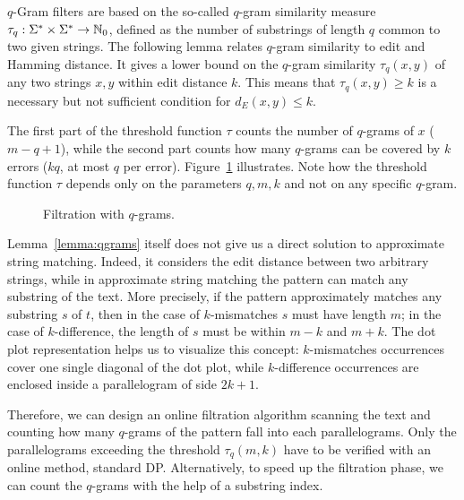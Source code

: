 $q$-Gram filters are based on the so-called $q$-gram similarity measure $\tau_q : \Sigma^{*} \times \Sigma^{*} \rightarrow \mathbb {N}_0$, defined as the number of substrings of length $q$ common to two given strings.
The following lemma relates $q$-gram similarity to edit and Hamming distance.
It gives a lower bound on the $q$-gram similarity $\tau_q(x,y)$ of any two strings $x,y$ within edit distance $k$.
This means that $\tau_q(x,y) \geq k$ is a necessary but not sufficient condition for $d_E(x,y) \leq k$.
The first part of the threshold function $\tau$ counts the number of $q$-grams of $x$ (\ie $m - q + 1$), while the second part counts how many $q$-grams can be covered by $k$ errors ($kq$, \ie at most $q$ per error).
Figure~\ref{fig:qgrams-ext} illustrates.
Note how the threshold function $\tau$ depends only on the parameters $q,m,k$ and not on any specific $q$-gram.

\begin{figure}[h]
\begin{center}
\caption{Filtration with $q$-grams.}
\label{fig:qgrams-ext}

\end{center}
\end{figure}

Lemma~\ref{lemma:qgrams} itself does not give us a direct solution to approximate string matching.
Indeed, it considers the edit distance between two arbitrary strings, while in approximate string matching the pattern can match any substring of the text.
More precisely, if the pattern approximately matches any substring $s$ of $t$, then in the case of $k$-mismatches $s$ must have length $m$; in the case of $k$-difference, the length of $s$ must be within $m - k$ and $m + k$.
The dot plot representation helps us to visualize this concept: $k$-mismatches occurrences cover one single diagonal of the dot plot, while $k$-difference occurrences are enclosed inside a parallelogram of side $2k+1$.

Therefore, we can design an online filtration algorithm scanning the text and counting how many $q$-grams of the pattern fall into each parallelograms.
Only the parallelograms exceeding the threshold $\tau_q(m,k)$ have to be verified with an online method, \eg standard DP.
Alternatively, to speed up the filtration phase, we can count the $q$-grams with the help of a substring index.

